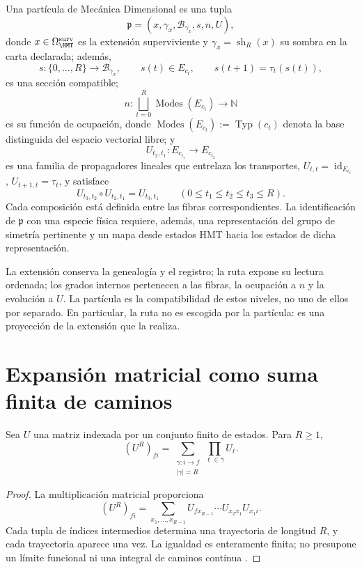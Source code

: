 \begin{definition}
Una partícula de Mecánica Dimensional es una tupla
\[
 \mathfrak p=(x,\gamma_x,\mathcal B_{\gamma_x},s,n,U),
\]
donde \(x\in\Omega_{\HMT}^{\rm surv}\) es la extensión superviviente y
\(\gamma_x=\operatorname{sh}_R(x)\) su sombra en la carta declarada; además,
\[
 s:\{0,\ldots,R\}\longrightarrow\mathcal B_{\gamma_x},\qquad
 s(t)\in E_{c_t},\qquad s(t+1)=\tau_t(s(t)),
\]
es una sección compatible;
\[
 n:\bigsqcup_{t=0}^{R}\operatorname{Modes}(E_{c_t})
 \longrightarrow\mathbb N
\]
es su función de ocupación, donde
\(\operatorname{Modes}(E_{c_t}):=\operatorname{Typ}(c_t)\) denota la base
distinguida del espacio vectorial libre; y
\[
 U_{t_2,t_1}:E_{c_{t_1}}\longrightarrow E_{c_{t_2}}
\]
es una familia de propagadores lineales que entrelaza los transportes,
\(U_{t,t}=\operatorname{id}_{E_{c_t}}\),
\(U_{t+1,t}=\tau_t\), y satisface
\[
 U_{t_3,t_2}\circ U_{t_2,t_1}=U_{t_3,t_1}
 \qquad(0\leq t_1\leq t_2\leq t_3\leq R).
\]
Cada composición está definida entre las fibras correspondientes.
La identificación de \(\mathfrak p\) con una especie
física requiere, además, una representación del grupo de simetría pertinente
y un mapa desde estados HMT hacia los estados de dicha representación.
\end{definition}

La extensión conserva la genealogía y el registro; la ruta expone su lectura
ordenada; los grados internos pertenecen a las fibras, la ocupación a \(n\) y
la evolución a \(U\). La partícula es la compatibilidad de estos niveles, no
uno de ellos por separado. En particular, la ruta no es escogida por la
partícula: es una proyección de la extensión que la realiza.
\fi

\ifdefined\HMTIncludeParticleQuantum
\section{Expansión matricial como suma finita de caminos}

\begin{theorem}
Sea \(U\) una matriz indexada por un conjunto finito de estados. Para
\(R\geq1\),
\[
 (U^R)_{fi}
 =\sum_{\substack{\gamma:i\to f\\|\gamma|=R}}
 \prod_{\ell\in\gamma}U_\ell.
\]
\end{theorem}
\begin{proof}
La multiplicación matricial proporciona
\[
 (U^R)_{fi}=\sum_{x_1,\ldots,x_{R-1}}
 U_{fx_{R-1}}\cdots U_{x_2x_1}U_{x_1i}.
\]
Cada tupla de índices intermedios determina una trayectoria de longitud \(R\),
y cada trayectoria aparece una vez. La igualdad es enteramente finita; no
presupone un límite funcional ni una integral de caminos continua
\cite{Feynman1948}.
\end{proof}

